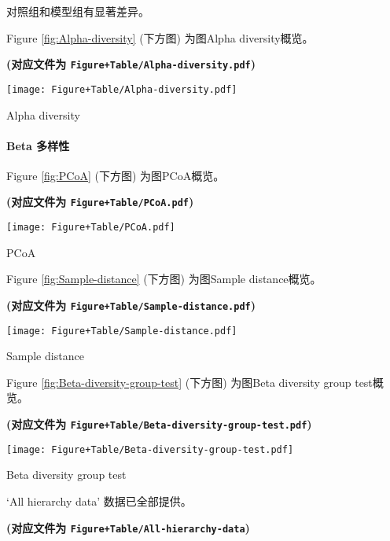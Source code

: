 \documentclass[
]{article}
\begin{document}
对照组和模型组有显著差异。

Figure \ref{fig:Alpha-diversity} (下方图) 为图Alpha diversity概览。

\textbf{(对应文件为 \texttt{Figure+Table/Alpha-diversity.pdf})}

\def\@captype{figure}
\begin{center}
\texttt{[image: Figure+Table/Alpha-diversity.pdf]}
\caption{Alpha diversity}\label{fig:Alpha-diversity}
\end{center}

\hypertarget{beta}{%
\paragraph{Beta 多样性}\label{beta}}

Figure \ref{fig:PCoA} (下方图) 为图PCoA概览。

\textbf{(对应文件为 \texttt{Figure+Table/PCoA.pdf})}

\def\@captype{figure}
\begin{center}
\texttt{[image: Figure+Table/PCoA.pdf]}
\caption{PCoA}\label{fig:PCoA}
\end{center}

Figure \ref{fig:Sample-distance} (下方图) 为图Sample distance概览。

\textbf{(对应文件为 \texttt{Figure+Table/Sample-distance.pdf})}

\def\@captype{figure}
\begin{center}
\texttt{[image: Figure+Table/Sample-distance.pdf]}
\caption{Sample distance}\label{fig:Sample-distance}
\end{center}

Figure \ref{fig:Beta-diversity-group-test} (下方图) 为图Beta diversity group test概览。

\textbf{(对应文件为 \texttt{Figure+Table/Beta-diversity-group-test.pdf})}

\def\@captype{figure}
\begin{center}
\texttt{[image: Figure+Table/Beta-diversity-group-test.pdf]}
\caption{Beta diversity group test}\label{fig:Beta-diversity-group-test}
\end{center}

`All hierarchy data' 数据已全部提供。

\textbf{(对应文件为 \texttt{Figure+Table/All-hierarchy-data})}
\end{document}
